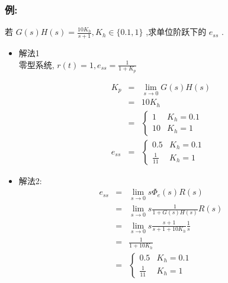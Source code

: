 \documentclass{article}
\begin{document}
\begin{frame}
\frametitle{例:}
\label{sec-3-2-10}


若 $G(s)H(s) =\frac{10K_h}{s+1},K_h\in\{0.1,1\}$ ,求单位阶跃下的 $e_{ss}$ .

\begin{itemize}

\item 解法1\\
\label{sec-3-2-10-1}%
零型系统, $r(t)=1,e_{ss}=\frac{1}{1+K_p}$

\begin{eqnarray*}
K_p &=  &\lim_{s\rightarrow 0}G(s)H(s) \\
    &=& 10K_h \\
    &=&
\begin{cases}
1  & K_h =0.1 \\
10 & K_h = 1
\end{cases}\\
e_{ss} &=&
\begin{cases}
0.5 & K_h=0.1 \\
\frac{1}{11} & K_h=1
\end{cases}
\end{eqnarray*}


\item 解法2:\\
\label{sec-3-2-10-2}%
\begin{eqnarray*}
e_{ss} &=& \lim_{s\rightarrow 0}s\Phi_e(s)R(s)\\
    &=&\lim_{s\rightarrow 0}s\frac{1}{1+G(s)H(s)}R(s)\\
    &=&\lim_{s\rightarrow 0}s\frac{s+1}{s+1+10K_h}\frac{1}{s}\\
    &=& \frac{1}{1+10K_h} \\
    &=&
\begin{cases}
0.5 & K_h=0.1 \\
\frac{1}{11} & K_h=1
\end{cases}
\end{eqnarray*}

\end{itemize} %
\end{frame}
\end{document}
